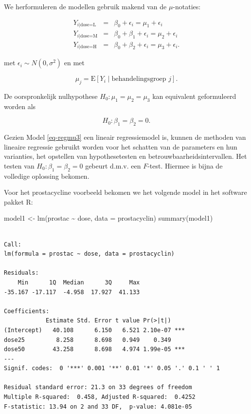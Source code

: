 \documentclass[
  dutch,
  letterpaper,
  12pt]{book}
\newenvironment{Shaded}{\begin{snugshade}}{\end{snugshade}}
\newcommand{\AttributeTok}[1]{\textcolor[rgb]{0.40,0.45,0.13}{#1}}
\newcommand{\FunctionTok}[1]{\textcolor[rgb]{0.28,0.35,0.67}{#1}}
\newcommand{\NormalTok}[1]{\textcolor[rgb]{0.00,0.23,0.31}{#1}}
\newcommand{\OtherTok}[1]{\textcolor[rgb]{0.00,0.23,0.31}{#1}}
\newcommand{\SpecialCharTok}[1]{\textcolor[rgb]{0.37,0.37,0.37}{#1}}
\theoremstyle{definition}
\theoremstyle{definition}
\theoremstyle{definition}
\theoremstyle{remark}
\begin{document}
We herformuleren de modellen gebruik makend van de \(\mu\)-notaties:

\begin{eqnarray*}
 Y_{i\vert \text{dose=L}} &=& \beta_0+\epsilon_i = \mu_1+\epsilon_i \\
 Y_{i\vert \text{dose=M}} &=& \beta_0+\beta_1+ \epsilon_i = \mu_2+\epsilon_i \\
 Y_{i\vert \text{dose=H}} &=& \beta_0+\beta_2 + \epsilon_i = \mu_3+\epsilon_i .
\end{eqnarray*}

met \(\epsilon_i \sim N(0,\sigma^2)\) en met

\[  \mu_j = \text{E}\left[Y_i \mid \text{behandelingsgroep } j\right].\]

De oorspronkelijk nulhypothese \(H_0:\mu_1=\mu_2=\mu_3\) kan equivalent
geformuleerd worden als

\[H_0: \beta_1=\beta_2=0.\]

Gezien Model \ref{eq-regmu3} een lineair regressiemodel is, kunnen de
methoden van lineaire regressie gebruikt worden voor het schatten van de
parameters en hun varianties, het opstellen van hypothesetesten en
betrouwbaarheidsintervallen. Het testen van \(H_0: \beta_1=\beta_2=0\)
gebeurt d.m.v. een \(F\)-test. Hiermee is bijna de volledige oplossing
bekomen.

Voor het prostacycline voorbeeld bekomen we het volgende model in het
software pakket R:

\begin{Shaded}
\begin{Highlighting}[]
\NormalTok{model1 }\OtherTok{\textless{}{-}} \FunctionTok{lm}\NormalTok{(prostac }\SpecialCharTok{\textasciitilde{}}\NormalTok{ dose, }\AttributeTok{data =}\NormalTok{ prostacyclin)}
\FunctionTok{summary}\NormalTok{(model1)}
\end{Highlighting}
\end{Shaded}

\begin{verbatim}

Call:
lm(formula = prostac ~ dose, data = prostacyclin)

Residuals:
    Min      1Q  Median      3Q     Max 
-35.167 -17.117  -4.958  17.927  41.133 

Coefficients:
            Estimate Std. Error t value Pr(>|t|)    
(Intercept)   40.108      6.150   6.521 2.10e-07 ***
dose25         8.258      8.698   0.949    0.349    
dose50        43.258      8.698   4.974 1.99e-05 ***
---
Signif. codes:  0 '***' 0.001 '**' 0.01 '*' 0.05 '.' 0.1 ' ' 1

Residual standard error: 21.3 on 33 degrees of freedom
Multiple R-squared:  0.458, Adjusted R-squared:  0.4252 
F-statistic: 13.94 on 2 and 33 DF,  p-value: 4.081e-05
\end{verbatim}
\end{document}
